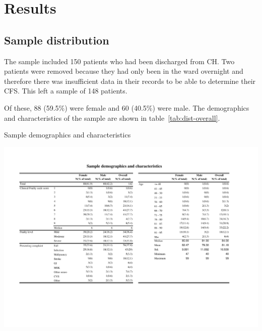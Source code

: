 \documentclass
[
	12pt,
	a4paper,
	oneside,
]{report}
\begin{document}
%
%

% 
%


\chapter{Results}

\section{Sample distribution}

The sample included 150 patients who had been discharged from CH. Two patients
were removed because they had only been in the ward overnight and therefore
there was insufficient data in their records to be able to determine their
CFS. This left a sample of 148 patients. 

Of these, 88 (59.5\%) were female and 60 (40.5\%) were male. The demographics 
and characteristics of the sample are shown in table~\ref{tab:dist-overall}.

\begin{table}[p]
\caption{Sample demographics and characteristics}
\label{tab:dist-overall}
\includegraphics[width=\textwidth,
	trim={1.5cm 4cm 2.5cm 2cm},
	clip,
	angle=90,
	scale=1.45]{media/dist-overall}
\end{table}
\end{document}
